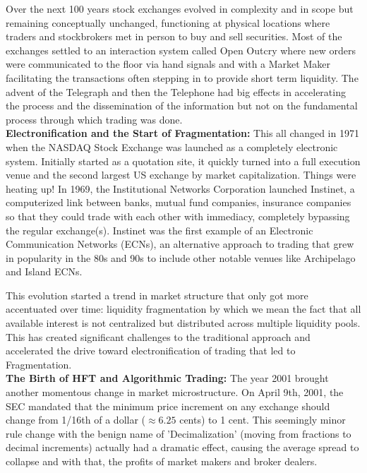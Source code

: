 Over the next 100 years stock exchanges evolved in complexity and in scope but remaining conceptually unchanged, functioning at physical locations where traders and stockbrokers met in person to buy and sell securities. Most of the exchanges settled to an interaction system called Open Outcry where new orders were communicated to the floor via hand signals and with a Market Maker facilitating the transactions often stepping in to provide short term liquidity. The advent of the Telegraph and then the Telephone had big effects in accelerating the process and the dissemination of the information but not on the fundamental process through which trading was done. \\


\noindent\textbf{Electronification and the Start of Fragmentation:} This all changed in 1971 when the NASDAQ Stock Exchange was launched as a completely electronic system. Initially started as a quotation site, it quickly turned into a full execution venue and the second largest US exchange by market capitalization. Things were heating up! In 1969, the Institutional Networks Corporation launched Instinet, a computerized link between banks, mutual fund companies, insurance companies so that they could trade with each other with immediacy, completely bypassing the regular exchange(s).  Instinet was the first example of an Electronic Communication Networks (ECNs), an alternative approach to trading that grew in popularity in the 80s and 90s to include other notable venues like Archipelago and Island ECNs.


This evolution started a trend in market structure that only got more accentuated over time: liquidity fragmentation by which we mean the fact that all available interest is not centralized but distributed across multiple liquidity pools. This has created significant challenges to the traditional approach and accelerated the drive toward electronification of trading that led to Fragmentation. \\



\noindent\textbf{The Birth of HFT and Algorithmic Trading:} The year 2001 brought another momentous change in market microstructure. On April 9th, 2001, the SEC mandated that the minimum price increment on any exchange should change from 1/16th of a dollar ($\approx6.25$ cents) to 1 cent. This seemingly  minor rule change with the benign name of 'Decimalization' (moving from fractions to decimal increments) actually had a dramatic effect, causing the average spread to collapse and with that, the profits of market makers and broker dealers.
 

